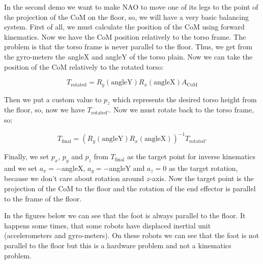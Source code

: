 In the second demo we want to make NAO to move one of its legs to the point of the projection of the CoM on the floor, so, we will have a very basic balancing system. First of all, we must calculate the position of the CoM using forward kinematics. Now we have the CoM position relatively to the torso frame. The problem is that the torso frame is never parallel to the floor. Thus, we get from the gyro-meters the angleX and angleY of the torso plain. Now we can take the position of the CoM relatively to the rotated torso:

\[
	T_{\text{rotated}} = R_y(\text{angleY})R_x(\text{angleX})A_{\text{CoM}}
\]

Then we put a custom value to \(p_z\) which represents the desired torso height from the floor, so, now we have \(T_{\text{rotated}'}\). Now we must rotate back to the torso frame, so:

\[
	T_{\text{final}} = \left(R_y(\text{angleY})R_x(\text{angleX})\right)^{-1}T_{\text{rotated}'}
\]

Finally, we set  \(p_x\), \(p_y\) and \(p_z\) from \(T_{\text{final}}\) as the target point for inverse kinematics and we set \(a_x = -\)angleX, \(a_y = -\)angleY and \(a_z = 0\) as the target rotation, because we don't care about rotation around \(z\)-axis. Now the target point is the projection of the CoM to the floor and the rotation of the end effector is parallel to the frame of the floor.

In the figures below we can see that the foot is always parallel to the floor. It happens some times, that some robots have displaced inertial unit (accelerometers and gyro-meters). On these robots we can see that the foot is not parallel to the floor but this is a hardware problem and not a kinematics problem.

